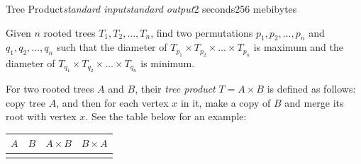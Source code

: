 \begin{problem}{Tree Product}{\textsl{standard input}}{\textsl{standard output}}{2 seconds}{256 mebibytes}

Given $n$ rooted trees $T_1,T_2,\ldots,T_n$, find two permutations $p_1,p_2,\dots,p_n$ and $q_1,q_2,\ldots,q_n$ such that the diameter of $T_{p_1} \times T_{p_2} \times \ldots \times T_{p_n}$ is maximum and the diameter of $T_{q_1} \times T_{q_2} \times \ldots \times T_{q_n}$ is minimum.

For two rooted trees $A$ and $B$, their \textit{tree product} $T = A \times B$ is defined as follows: copy tree $A$, and then for each vertex $x$ in it, make a copy of $B$ and merge its root with vertex $x$. See the table below for an example:
\begin{center}
\begin{tabular}{cccc}
$A$ & $B$ & $A \times B$ & $B \times A$ \\
\hline \\

\end{tabular}
\end{center}
\end{problem}
